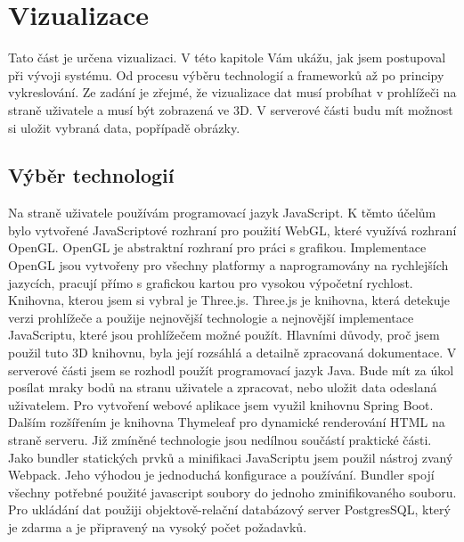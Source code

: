 \documentclass[czech,bachelor,dept420,male,cpdeclaration]{diploma}
\begin{document}
\section{Vizualizace}
Tato část je určena vizualizaci. V této kapitole Vám ukážu, jak jsem postupoval při vývoji systému. Od procesu výběru technologií a frameworků až po principy vykreslování. Ze zadání je zřejmé, že vizualizace dat musí probíhat v prohlížeči na straně uživatele a musí být zobrazená ve 3D. V serverové části budu mít možnost si uložit vybraná data, popřípadě obrázky.

\subsection{Výběr technologií} 
Na straně uživatele používám programovací jazyk JavaScript. K těmto účelům bylo vytvořené JavaScriptové rozhraní pro použití WebGL, které využívá rozhraní OpenGL. OpenGL je abstraktní rozhraní pro práci s grafikou. Implementace OpenGL jsou vytvořeny pro všechny platformy a naprogramovány na rychlejších jazycích, pracují přímo s grafickou kartou pro vysokou výpočetní rychlost. Knihovna, kterou jsem si vybral je Three.js. Three.js je knihovna, která detekuje verzi prohlížeče a použije nejnovější technologie a nejnovější implementace JavaScriptu, které jsou prohlížečem možné použít. Hlavními důvody, proč jsem použil tuto 3D knihovnu, byla její rozsáhlá a detailně zpracovaná dokumentace. 
V serverové části jsem se rozhodl použít programovací jazyk Java. Bude mít za úkol posílat mraky bodů na stranu uživatele a zpracovat, nebo uložit data odeslaná uživatelem. Pro vytvoření webové aplikace jsem využil knihovnu Spring Boot. Dalším rozšířením je knihovna Thymeleaf pro dynamické renderování HTML na straně serveru. Již zmíněné technologie jsou nedílnou součástí praktické části. Jako bundler statických prvků a minifikaci JavaScriptu jsem použil nástroj zvaný Webpack. Jeho výhodou je jednoduchá konfigurace a používání. Bundler spojí všechny potřebné použité javascript soubory do jednoho zminifikovaného souboru. Pro ukládání dat použiji objektově-relační databázový server PostgresSQL, který je zdarma a je připravený na vysoký počet požadavků.
 
\end{document}
